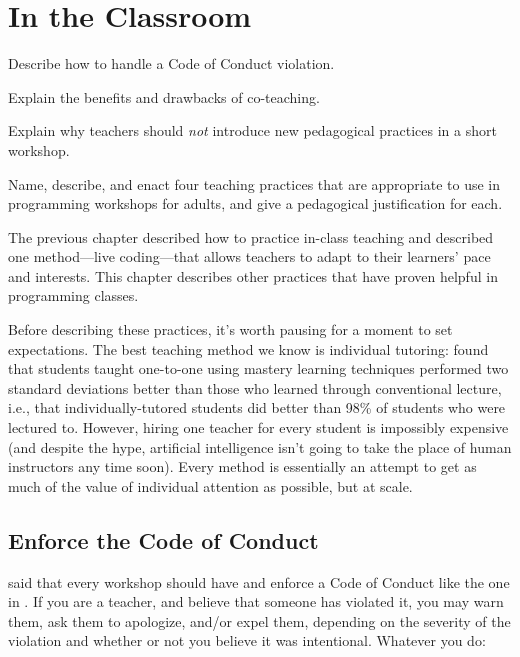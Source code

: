 \chapter{In the Classroom}\label{s:classroom}

\begin{objectives}

\item
  Describe how to handle a Code of Conduct violation.

\item
  Explain the benefits and drawbacks of co-teaching.

\item
  Explain why teachers should \emph{not} introduce new pedagogical
  practices in a short workshop.

\item
  Name, describe, and enact four teaching practices that are
  appropriate to use in programming workshops for adults, and give a
  pedagogical justification for each.

\end{objectives}

The previous chapter described how to practice in-class teaching and
described one method---live coding---that allows teachers to adapt to
their learners' pace and interests.  This chapter describes other
practices that have proven helpful in programming classes.

Before describing these practices, it's worth pausing for a moment to
set expectations.  The best teaching method we know is individual
tutoring: \cite{Bloo1984} found that students taught one-to-one using
mastery learning techniques performed two standard deviations better
than those who learned through conventional lecture, i.e., that
individually-tutored students did better than 98\% of students who
were lectured to.  However, hiring one teacher for every student is
impossibly expensive (and despite the hype, artificial intelligence
isn't going to take the place of human instructors any time soon).
Every method is essentially an attempt to get as much of the value of
individual attention as possible, but at scale.

\section{Enforce the Code of Conduct}\label{s:classroom-enforce}

 said that every workshop should have and enforce a
Code of Conduct like the one in .  If you are a
teacher, and believe that someone has violated it, you may warn them,
ask them to apologize, and/or expel them, depending on the severity of
the violation and whether or not you believe it was intentional.
Whatever you do:

